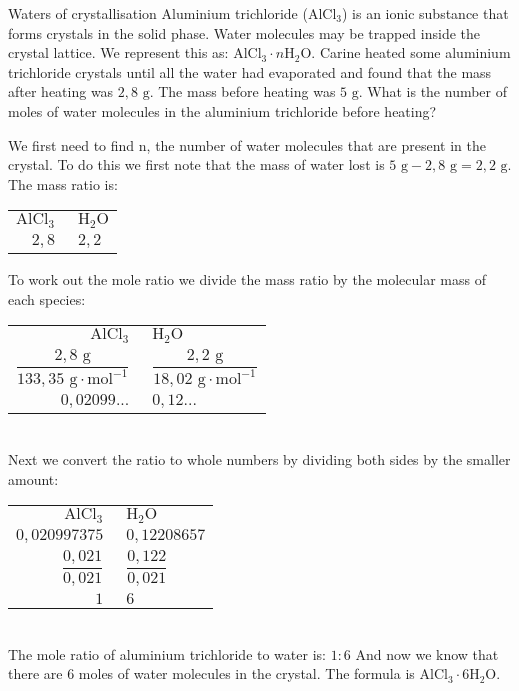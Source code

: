     \noindent
\par
            \label{m38712*eid672431}
      \noindent
      \begin{wex}{Waters of crystallisation}{
\label{m38712*pid47982}
\label{m38712*id64827}Aluminium trichloride (${\text{AlCl}}_{3}$) is an ionic substance that forms crystals in the solid phase. Water molecules may be trapped inside the crystal lattice. We represent this as: ${\text{AlCl}}_{3} \cdot n{\text{H}}_{2}\text{O}$. Carine heated some aluminium trichloride crystals until all the water had evaporated and found that the mass after heating was $2,8 \text{ g}$. The mass before heating was $5 \text{ g}$. What is the number of moles of water molecules in the aluminium trichloride before heating?
}
{
We first need to find n, the number of water molecules that are present in the crystal. To do this we first note that the mass of water lost is $5 \text{ g} - 2,8 \text{ g} = 2,2 \text{ g}$.
  \label{m38712*id3892}The mass ratio is:\\
\begin{tabular}{r@{:}l}
 $\text{AlCl}_3~$ & $~\text{H}_{2}\text{O}$ \\
   $2,8~$ & $~2,2$ \\
\end{tabular}
To work out the mole ratio we divide the mass ratio by the molecular mass of each species:\\
\begin{tabular}{r@{:}l}
 $\text{AlCl}_3~$ & $~\text{H}_{2}\text{O}$ \\
    $\dfrac{2,8 \text{ g}}{133,35 \text{ g} \cdot \text{mol}^{-1}}~$ & $~\dfrac{2,2 \text{ g}}{18,02 \text{ g} \cdot \text{mol}^{-1}}$ \\
$0,02099...~$ & $~0,12...$  \\
\end{tabular}\\
Next we convert the ratio to whole numbers by dividing both sides by the smaller amount:\\
\begin{tabular}{r@{:}l}
 $\text{AlCl}_3~$ & $~\text{H}_{2}\text{O}$ \\
$0,020997375~$ & $~0,12208657$ \\
$\dfrac{0,021}{0,021}~$ & $~\dfrac{0,122}{0,021}$ \\
$1~$ & $~6$ \\
\end{tabular}\\
The mole ratio of aluminium trichloride to water is: $1:6$
And now we know that there are $6$ moles of water molecules in the crystal. The formula is $\text{AlCl}_{3} \cdot 6\text{H}_{2}\text{O}$.
}
    \end{wex}
